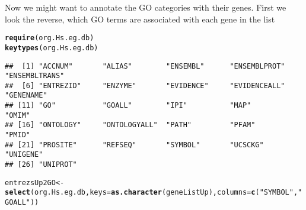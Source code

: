 \documentclass{article}\usepackage[]{graphicx}\usepackage[]{color}
\makeatletter
\newcommand{\hlstr}[1]{\textcolor[rgb]{0.192,0.494,0.8}{#1}}%
\newcommand{\hlstd}[1]{\textcolor[rgb]{0.345,0.345,0.345}{#1}}%
\newcommand{\hlkwb}[1]{\textcolor[rgb]{0.69,0.353,0.396}{#1}}%
\newcommand{\hlkwc}[1]{\textcolor[rgb]{0.333,0.667,0.333}{#1}}%
\newcommand{\hlkwd}[1]{\textcolor[rgb]{0.737,0.353,0.396}{\textbf{#1}}}%
\newenvironment{kframe}{%
 \def\at@end@of@kframe{}%
 \ifinner\ifhmode%
  \def\at@end@of@kframe{\end{minipage}}%
  \begin{minipage}{\columnwidth}%
 \fi\fi%
 \def\FrameCommand##1{\hskip\@totalleftmargin \hskip-\fboxsep
 \colorbox{shadecolor}{##1}\hskip-\fboxsep
     \hskip-\linewidth \hskip-\@totalleftmargin \hskip\columnwidth}%
 \MakeFramed {\advance\hsize-\width
   \@totalleftmargin\z@ \linewidth\hsize
   \@setminipage}}%
 {\par\unskip\endMakeFramed%
 \at@end@of@kframe}
\newenvironment{knitrout}{}{} %
\makeatother
\begin{document}
Now we might want to annotate the GO categories with their genes.
First we look the reverse, which GO terms are associated with each gene in the list

\begin{knitrout}
\color{fgcolor}\begin{kframe}
\begin{alltt}
\hlkwd{require}\hlstd{(org.Hs.eg.db)}
\hlkwd{keytypes}\hlstd{(org.Hs.eg.db)}
\end{alltt}
\begin{verbatim}
##  [1] "ACCNUM"       "ALIAS"        "ENSEMBL"      "ENSEMBLPROT"  "ENSEMBLTRANS"
##  [6] "ENTREZID"     "ENZYME"       "EVIDENCE"     "EVIDENCEALL"  "GENENAME"    
## [11] "GO"           "GOALL"        "IPI"          "MAP"          "OMIM"        
## [16] "ONTOLOGY"     "ONTOLOGYALL"  "PATH"         "PFAM"         "PMID"        
## [21] "PROSITE"      "REFSEQ"       "SYMBOL"       "UCSCKG"       "UNIGENE"     
## [26] "UNIPROT"
\end{verbatim}
\begin{alltt}
\hlstd{entrezsUp2GO} \hlkwb{<-} \hlkwd{select}\hlstd{(org.Hs.eg.db,} \hlkwc{keys} \hlstd{=} \hlkwd{as.character}\hlstd{(geneListUp),} \hlkwc{columns}\hlstd{=}\hlkwd{c}\hlstd{(}\hlstr{"SYMBOL"}\hlstd{,} \hlstr{"GOALL"}\hlstd{))}
\end{alltt}



\end{kframe}
\end{knitrout}
\end{document}
